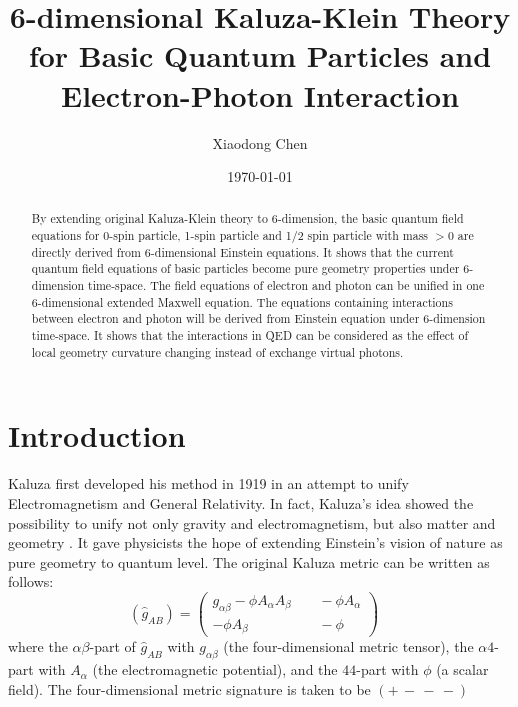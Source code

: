 \documentclass[twocolumn,showpacs,preprintnumbers,amsmath,amssymb]{revtex4}
\begin{document}
\preprint{ }


\title{ 6-dimensional Kaluza-Klein Theory for Basic Quantum Particles and Electron-Photon Interaction}  
\author{\normalsize Xiaodong Chen}

\date{\today}

\begin{abstract} 
By extending original Kaluza-Klein theory to 6-dimension, the basic quantum field equations for 0-spin particle,
1-spin particle and 1/2 spin particle with mass $>$0 are directly derived from 6-dimensional Einstein equations. 
It shows that the current quantum field
equations of basic particles become pure geometry properties under 6-dimension time-space. The field equations
of electron and photon can be unified in one 6-dimensional extended Maxwell equation. 
The equations containing interactions between electron and photon will be derived from Einstein equation 
under 6-dimension time-space. It shows that the interactions in QED can be considered as
the effect of local geometry curvature changing instead of exchange virtual photons. 

\end{abstract}

\maketitle

\section{Introduction} \label{INTRO}

Kaluza \cite{Kal21} first developed his method in 1919 in an attempt to unify Electromagnetism 
and General Relativity. In fact, Kaluza's idea showed the possibility to unify not only
gravity and electromagnetism, but also matter and geometry \cite{Overduin}. It gave physicists the hope of extending
Einstein's vision of nature as pure geometry to quantum level. The original Kaluza metric can be 
written as follows: 
\begin{equation}
\left( \hat{g}_{AB} \right) = \left( \begin{array}{cc}
   g_{\alpha\beta} - \phi A_{\alpha} A_{\beta} \; \; & \; \; 
     -\phi A_{\alpha} \\
   - \phi A_{\beta} \; \;                                & \; \; 
     - \phi
   \end{array} \right) \; \; \; 
\label{5dMetric}
\end{equation}
where the $\alpha\beta$-part of $\hat{g}_{AB}$ with $g_{\alpha\beta}$ 
(the four-dimensional metric tensor), the $\alpha 4$-part with $A_{\alpha}$ (the electromagnetic potential),
and the $44$-part with $\phi$  (a scalar field). The four-dimensional metric signature is taken 
to be $(+ \, - \, - \, -)$
\end{document}
